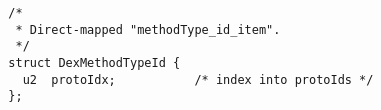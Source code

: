 {\tiny \begin{verbatim}
  /*
   * Direct-mapped "methodType_id_item".
   */
  struct DexMethodTypeId {
    u2  protoIdx;           /* index into protoIds */
  };
\end{verbatim} }